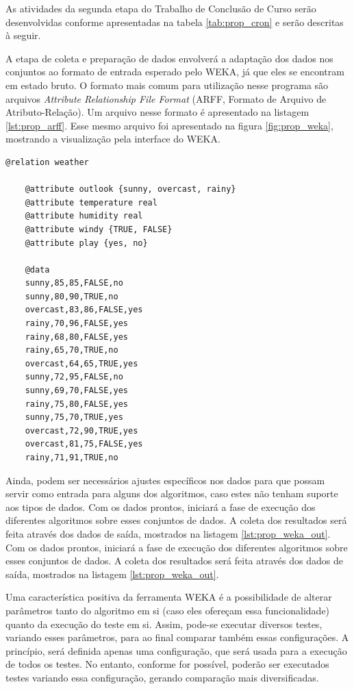 As atividades da segunda etapa do Trabalho de Conclusão de Curso serão desenvolvidas conforme apresentadas na tabela \ref{tab:prop_cron} e serão descritas à seguir.

A etapa de coleta e preparação de dados envolverá a adaptação dos dados nos conjuntos ao formato de entrada esperado pelo WEKA, já que eles se encontram em estado bruto. O formato mais comum para utilização nesse programa são arquivos \emph{Attribute Relationship File Format} (ARFF, Formato de Arquivo de Atributo-Relação). Um arquivo nesse formato é apresentado na listagem \ref{lst:prop_arff}. Esse mesmo arquivo foi apresentado na figura \ref{fig:prop_weka}, mostrando a visualização pela interface do WEKA.

\vspace{1cm}
\begin{lstlisting}[caption=Exemplo de arquivo no formato ARFF, label=lst:prop_arff]
    @relation weather

    @attribute outlook {sunny, overcast, rainy}
    @attribute temperature real
    @attribute humidity real
    @attribute windy {TRUE, FALSE}
    @attribute play {yes, no}

    @data
    sunny,85,85,FALSE,no
    sunny,80,90,TRUE,no
    overcast,83,86,FALSE,yes
    rainy,70,96,FALSE,yes
    rainy,68,80,FALSE,yes
    rainy,65,70,TRUE,no
    overcast,64,65,TRUE,yes
    sunny,72,95,FALSE,no
    sunny,69,70,FALSE,yes
    rainy,75,80,FALSE,yes
    sunny,75,70,TRUE,yes
    overcast,72,90,TRUE,yes
    overcast,81,75,FALSE,yes
    rainy,71,91,TRUE,no
\end{lstlisting}
\vspace{1cm}

Ainda, podem ser necessários ajustes específicos nos dados para que possam servir como entrada para alguns dos algoritmos, caso estes não tenham suporte aos tipos de dados. Com os dados prontos, iniciará a fase de execução dos diferentes algoritmos sobre esses conjuntos de dados. A coleta dos resultados será feita através dos dados de saída, mostrados na listagem \ref{lst:prop_weka_out}. Com os dados prontos, iniciará a fase de execução dos diferentes algoritmos sobre esses conjuntos de dados. A coleta dos resultados será feita através dos dados de saída, mostrados na listagem \ref{lst:prop_weka_out}.

Uma característica positiva da ferramenta WEKA é a possibilidade de alterar parâmetros tanto do algoritmo em si (caso eles ofereçam essa funcionalidade) quanto da execução do teste em si. Assim, pode-se executar diversos testes, variando esses parâmetros, para ao final comparar também essas configurações. A princípio, será definida apenas uma configuração, que será usada para a execução de todos os testes. No entanto, conforme for possível, poderão ser executados testes variando essa configuração, gerando comparação mais diversificadas.

